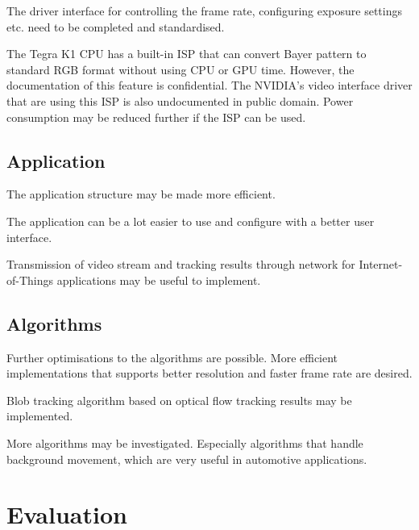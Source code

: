 The driver interface for controlling the frame rate, configuring exposure settings etc. need to be completed and standardised.

The Tegra K1 CPU has a built-in ISP that can convert Bayer pattern to standard RGB format without using CPU or GPU time. However, the documentation of this feature is confidential. The NVIDIA's video interface driver that are using this ISP is also undocumented in public domain. Power consumption may be reduced further if the ISP can be used.

\subsection{Application}

The application structure may be made more efficient.

The application can be a lot easier to use and configure with a better user interface.

Transmission of video stream and tracking results through network for Internet-of-Things applications may be useful to implement.

\subsection{Algorithms}

Further optimisations to the algorithms are possible. More efficient implementations that supports better resolution and faster frame rate are desired.

Blob tracking algorithm based on optical flow tracking results may be implemented.

More algorithms may be investigated. Especially algorithms that handle background movement, which are very useful in automotive applications.

\section{Evaluation}

